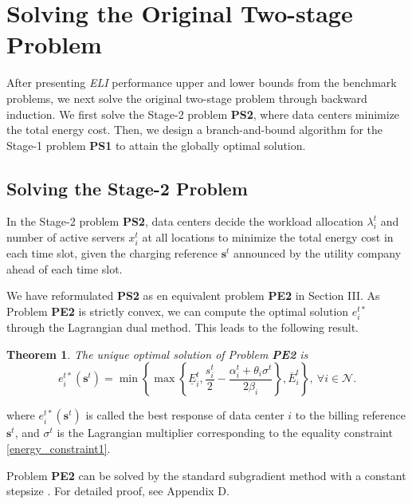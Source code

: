 \documentclass[journal]{IEEEtran}
\newtheorem{theorem}{Theorem}
\begin{document}
	\section{Solving the Original Two-stage Problem}
	After presenting \emph{ELI} performance upper and lower bounds from the benchmark problems, we next solve the original two-stage problem through backward induction. We first solve the Stage-2 problem \textbf{PS2}, where data centers minimize the total energy cost. Then, we design a branch-and-bound algorithm for the Stage-1 problem \textbf{PS1} to attain the globally optimal solution.
	

	\subsection{Solving the Stage-2 Problem}
	In the Stage-2 problem \textbf{PS2}, data centers decide the workload allocation $\lambda_{i}^{t}$ and number of active servers $x_{i}^{t}$ at all locations to minimize the total energy cost in each time slot, given the charging reference $\boldsymbol{s}^{t}$ announced by the utility company ahead of each time slot. 
	
	We have reformulated \textbf{PS2} as en equivalent problem \textbf{PE2} in Section III. As Problem \textbf{PE2} is strictly convex, we can compute the optimal solution $e_i^{t*}$ through the Lagrangian dual method. This leads to the following result.
	\begin{theorem}\label{solve_pe2}
		The unique optimal solution of Problem \textbf{PE2} is
		\begin{equation}\label{opt_pe2-t}
			e_{i}^{t*}(\boldsymbol{s}^{t})= \min
			\left\{
			\max \left\{ \underline{E}_{i}^{t},
			\frac {s_{i}^{t}}{2} - \frac {\alpha_{i}^{t}+ \theta_i \sigma^t} {2 \beta_{i}} \right\}
			,\overline{E}_{i}^{t} \right\},~\forall i \in \mathcal{N}.
		\end{equation}
	\end{theorem}
	where $e_{i}^{t \ast}(\boldsymbol{s}^{t})$ is called the best response of data center $i$ to the billing reference $\boldsymbol{s}^{t}$, and $\sigma^t$ is the Lagrangian multiplier corresponding to the equality constraint \eqref{energy_constraint1}. 
	
	Problem \textbf{PE2} can be solved by the standard subgradient method with a constant stepsize \cite{convex}. For detailed proof, see Appendix D.
	
	
\end{document}
